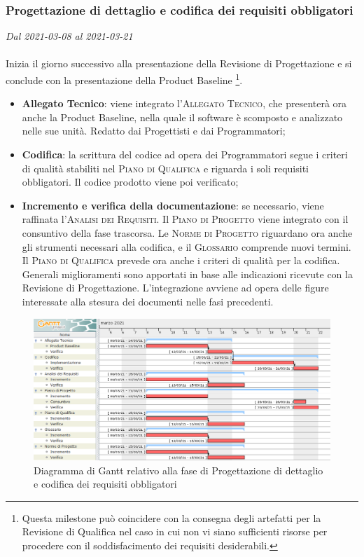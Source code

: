 \subsubsection{Progettazione di dettaglio e codifica dei requisiti obbligatori}

\textit{Dal 2021-03-08 al 2021-03-21}
\\\\
Inizia il giorno successivo alla presentazione della Revisione di Progettazione e si conclude con la presentazione della Product Baseline \footnote{Questa milestone può coincidere con la consegna degli artefatti per la Revisione di Qualifica nel caso in cui non vi siano sufficienti risorse per procedere con il soddisfacimento dei requisiti desiderabili.}.
\begin{itemize}
	\item \textbf{Allegato Tecnico}: viene integrato l'\textsc{Allegato Tecnico}, che presenterà ora anche la Product Baseline, nella quale il software è scomposto e analizzato nelle sue unità. Redatto dai Progettisti e dai Programmatori;
	\item \textbf{Codifica}: la scrittura del codice ad opera dei Programmatori segue i criteri di qualità stabiliti nel \textsc{Piano di Qualifica} e riguarda i soli requisiti obbligatori. Il codice prodotto viene poi verificato;
	\item \textbf{Incremento e verifica della documentazione}: se necessario, viene raffinata l'\textsc{Analisi dei Requisiti}. Il \textsc{Piano di Progetto} viene integrato con il consuntivo della fase trascorsa.  Le \textsc{Norme di Progetto} riguardano ora anche gli strumenti necessari alla codifica, e il \textsc{Glossario} comprende nuovi termini. Il \textsc{Piano di Qualifica} prevede ora anche i criteri di qualità per la codifica. Generali miglioramenti sono apportati in base alle indicazioni ricevute con la Revisione di Progettazione. L'integrazione avviene ad opera delle figure interessate alla stesura dei documenti nelle fasi precedenti.
	
\end{itemize}


\begin{figure}[H]
	\centering
	\includegraphics[scale=0.52]{res/images/04_gantt_codifica_obbligatori.png}
	\caption{Diagramma di Gantt relativo alla fase di Progettazione di dettaglio e codifica dei requisiti obbligatori}
\end{figure}



